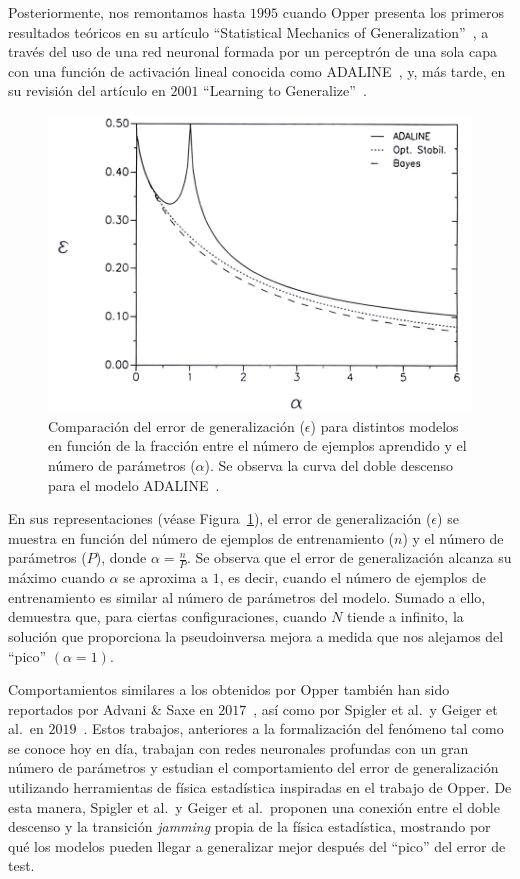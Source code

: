 Posteriormente, nos remontamos hasta $1995$ cuando Opper presenta los primeros resultados teóricos en su artículo ``Statistical Mechanics of Generalization''~\cite{Opper1995}, a través del uso de una red neuronal formada por un perceptrón de una sola capa con una función de activación lineal conocida como ADALINE~\cite{WidrowHoff1988}, y, más tarde, en su revisión del artículo en $2001$ ``Learning to Generalize''~\cite{Opper2001}.

\begin{figure}[h]
    \centering
    \includegraphics[width=0.8\linewidth]{img/estadoarte2.png}
    \caption[\textit{Deep Double Descent} presente en ADALINE.]{Comparación del error de generalización ($\epsilon$) para distintos modelos en función de la fracción entre el número de ejemplos aprendido y el número de parámetros ($\alpha$). Se observa la curva del doble descenso para el modelo ADALINE~\cite{Opper1995}.}\label{fig:estadoarte2}
\end{figure}

En sus representaciones (véase Figura~\ref{fig:estadoarte2}), el error de generalización ($\epsilon$) se muestra en función del número de ejemplos de entrenamiento ($n$) y el número de parámetros ($P$), donde $\alpha = \frac{n}{P}$. Se observa que el error de generalización alcanza su máximo cuando $\alpha$ se aproxima a $1$, es decir, cuando el número de ejemplos de entrenamiento es similar al número de parámetros del modelo. Sumado a ello, demuestra que, para ciertas configuraciones, cuando $N$ tiende a infinito, la solución que proporciona la pseudoinversa mejora a medida que nos alejamos del ``pico'' $(\alpha = 1)$. 

Comportamientos similares a los obtenidos por Opper también han sido reportados por Advani \& Saxe en $2017$~\cite{Advani2017}, así como por Spigler et al.\ y Geiger et al.\ en $2019$~\cite{Spigler2019, Geiger2019}. Estos trabajos, anteriores a la formalización del fenómeno tal como se conoce hoy en día, trabajan con redes neuronales profundas con un gran número de parámetros y estudian el comportamiento del error de generalización utilizando herramientas de física estadística inspiradas en el trabajo de Opper. De esta manera, Spigler et al.\ y Geiger et al.\ proponen una conexión entre el doble descenso y la transición \textit{jamming} propia de la física estadística, mostrando por qué los modelos pueden llegar a generalizar mejor después del ``pico'' del error de test.

